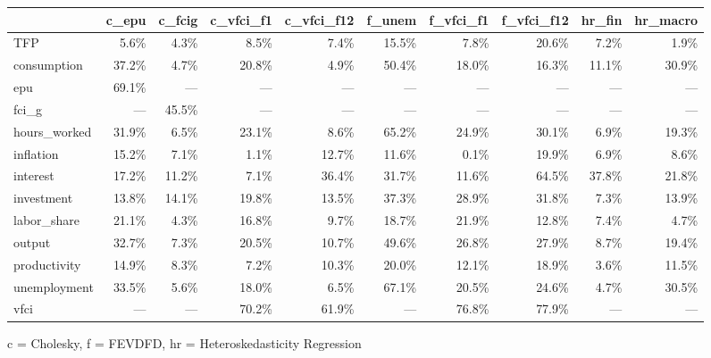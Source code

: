 
\fontsize{12.0pt}{14.4pt}\selectfont
\begin{tabular*}{\linewidth}{@{\extracolsep{\fill}}l|rrrrrrrrr}
\toprule
 & c\_epu & c\_fcig & c\_vfci\_f1 & c\_vfci\_f12 & f\_unem & f\_vfci\_f1 & f\_vfci\_f12 & hr\_fin & hr\_macro \\ 
\midrule\addlinespace[2.5pt]
TFP & 5.6\% & 4.3\% & 8.5\% & 7.4\% & 15.5\% & 7.8\% & 20.6\% & 7.2\% & 1.9\% \\ 
consumption & 37.2\% & 4.7\% & 20.8\% & 4.9\% & 50.4\% & 18.0\% & 16.3\% & 11.1\% & 30.9\% \\ 
epu & 69.1\% & — & — & — & — & — & — & — & — \\ 
fci\_g & — & 45.5\% & — & — & — & — & — & — & — \\ 
hours\_worked & 31.9\% & 6.5\% & 23.1\% & 8.6\% & 65.2\% & 24.9\% & 30.1\% & 6.9\% & 19.3\% \\ 
inflation & 15.2\% & 7.1\% & 1.1\% & 12.7\% & 11.6\% & 0.1\% & 19.9\% & 6.9\% & 8.6\% \\ 
interest & 17.2\% & 11.2\% & 7.1\% & 36.4\% & 31.7\% & 11.6\% & 64.5\% & 37.8\% & 21.8\% \\ 
investment & 13.8\% & 14.1\% & 19.8\% & 13.5\% & 37.3\% & 28.9\% & 31.8\% & 7.3\% & 13.9\% \\ 
labor\_share & 21.1\% & 4.3\% & 16.8\% & 9.7\% & 18.7\% & 21.9\% & 12.8\% & 7.4\% & 4.7\% \\ 
output & 32.7\% & 7.3\% & 20.5\% & 10.7\% & 49.6\% & 26.8\% & 27.9\% & 8.7\% & 19.4\% \\ 
productivity & 14.9\% & 8.3\% & 7.2\% & 10.3\% & 20.0\% & 12.1\% & 18.9\% & 3.6\% & 11.5\% \\ 
unemployment & 33.5\% & 5.6\% & 18.0\% & 6.5\% & 67.1\% & 20.5\% & 24.6\% & 4.7\% & 30.5\% \\ 
vfci & — & — & 70.2\% & 61.9\% & — & 76.8\% & 77.9\% & — & — \\ 
\bottomrule
\end{tabular*}
\begin{minipage}{\linewidth}
c = Cholesky, f = FEVDFD, hr = Heteroskedasticity Regression\\
\end{minipage}


